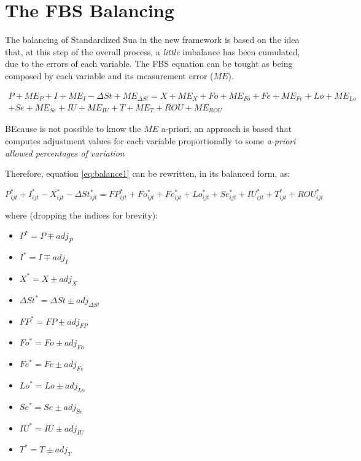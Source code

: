\documentclass[]{article}
\providecommand{\tightlist}{%
  \setlength{\itemsep}{0pt}\setlength{\parskip}{0pt}}
\begin{document}
\section{The FBS Balancing}\label{the-fbs-balancing}

The balancing of Standardized Sua in the new framework is based on the
idea that, at this step of the overall process, a \emph{little}
imbalance has been cumulated, due to the errors of each variable. The
FBS equation can be tought as being composed by each variable and its
measurement error (\(ME\)).

\begin{multline}
\label{eq:balance_b}
    P + ME_{P} + I + ME_{I} - \Delta St + ME_{\Delta St} = X + ME_{X} + Fo +ME_{Fo} + Fe + ME_{Fe} + Lo + ME_{Lo} \\
    + Se + ME_{Se} + IU + ME_{IU} + T + ME_{T} + ROU + ME_{ROU}
\end{multline}

BEcause is not possible to know the \(ME\) a-priori, an approach is
based that computes adjustment values for each variable proportionally
to some \emph{a-priori allowed percentages of variation}

Therefore, equation \ref{eq:balance1} can be rewritten, in its balanced
form, as:

\begin{equation}
\label{eq:balance3}
P^*_{ijt} + I^*_{ijt} - X^*_{ijt} - \Delta St^*_{ijt} = FP^*_{ijt} + Fo^*_{ijt} + Fe^*_{ijt} + Lo^*_{ijt} + Se^*_{ijt} + IU^*_{ijt} + T^*_{ijt}  + ROU^*_{ijt}
\end{equation}

where (dropping the indices for brevity):

\begin{itemize}
\tightlist
\item
  \(P^* = P \mp adj_{P}\)
\item
  \(I^* = I \mp adj_{I}\)
\item
  \(X^* = X \pm adj_{X}\)
\item
  \(\Delta St^* = \Delta St \pm adj_{\Delta St}\)
\item
  \(FP^* = FP \pm adj_{FP}\)
\item
  \(Fo^* = Fo \pm adj_{Fo}\)
\item
  \(Fe^* = Fe \pm adj_{Fe}\)
\item
  \(Lo^* = Lo \pm adj_{Lo}\)
\item
  \(Se^* = Se \pm adj_{Se}\)
\item
  \(IU^* = IU \pm adj_{IU}\)
\item
  \(T^* = T \pm adj_{T}\)
\end{itemize}
\end{document}
